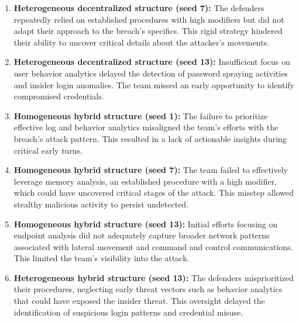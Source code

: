 \documentclass[letterpaper]{article} %
\begin{document}
\begin{enumerate}
    \item \textbf{Heterogeneous decentralized structure (seed 7):} The defenders repeatedly relied on established procedures with high modifiers but did not adapt their approach to the breach's specifics. This rigid strategy hindered their ability to uncover critical details about the attacker’s movements.

    \item \textbf{Heterogeneous decentralized structure (seed 13):} Insufficient focus on user behavior analytics delayed the detection of password spraying activities and insider login anomalies. The team missed an early opportunity to identify compromised credentials.

    \item \textbf{Homogeneous hybrid structure (seed 1):} The failure to prioritize effective log and behavior analytics misaligned the team's efforts with the breach’s attack pattern. This resulted in a lack of actionable insights during critical early turns.

    \item \textbf{Homogeneous hybrid structure (seed 7):} The team failed to effectively leverage memory analysis, an established procedure with a high modifier, which could have uncovered critical stages of the attack. This misstep allowed stealthy malicious activity to persist undetected.

    \item \textbf{Homogeneous hybrid structure (seed 13):} Initial efforts focusing on endpoint analysis did not adequately capture broader network patterns associated with lateral movement and command and control communications. This limited the team’s visibility into the attack.

    \item \textbf{Heterogeneous hybrid structure (seed 13):} The defenders misprioritized their procedures, neglecting early threat vectors such as behavior analytics that could have exposed the insider threat. This oversight delayed the identification of suspicious login patterns and credential misuse.
\end{enumerate}

\end{document}
